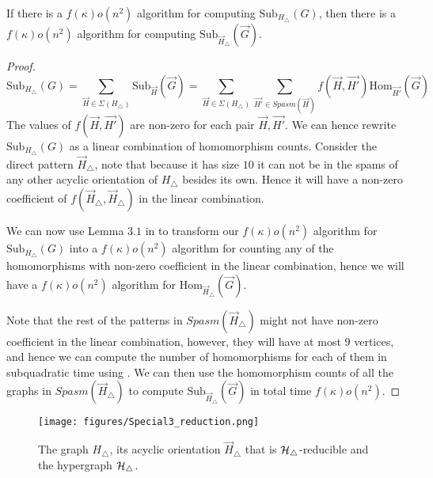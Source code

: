 \documentclass[a4paper,UKenglish,cleveref, autoref, numberwithinsect, thm-restate]{lipics-v2021}
\newcommand{\reducible}[1]{${#1}$-reducible}
\newcommand{\hyperthree}{\cH_\triangle}
\newcommand{\Hom}[2]{\mathrm{Hom}_{#2}(#1)}
\newcommand{\Sub}[2]{\mathrm{Sub}_{#2}(#1)}
\newcommand{\Spasm}{Spasm}
\newcommand{\degen}{\kappa}
\newcommand{\cH}{{\cal H}}
\begin{document}
	\begin{lemma} \label{lem:aux_conj}
		If there is a $f(\degen)o(n^2)$ algorithm for computing $\Sub{G}{H_\triangle}$, then there is a $f(\degen)o(n^2)$ algorithm for computing $\Sub{\vec{G}}{\vec{H}_\triangle}$.
	\end{lemma}
	\begin{proof}
		\begin{equation}
			\Sub{G}{H_\triangle} = \sum_{\vec{H} \in \Sigma(H_\triangle)} \Sub{\vec{G}}{\vec{H}} = \sum_{\vec{H} \in \Sigma(H_\triangle)} \sum_{\vec{H'} \in \Spasm(\vec{H})}  f(\vec{H},\vec{H'})\Hom{\vec{G}}{\vec{H'}}
		\end{equation}
	The values of $f(\vec{H},\vec{H'})$ are non-zero for each pair $\vec{H},\vec{H'}$. We can hence rewrite $\Sub{G}{H_\triangle}$ as a linear combination of homomorphism counts. Consider the direct pattern $\vec{H}_\triangle$, note that because it has size $10$ it can not be in the spams of any other acyclic orientation of $H_\triangle$ besides its own. Hence it will have a non-zero coefficient of $f(\vec{H}_\triangle,\vec{H}_\triangle)$ in the linear combination.
	
	We can now use Lemma $3.1$ in \cite{GiLeSh+23} to transform our $f(\degen)o(n^2)$ algorithm for $\Sub{G}{H_\triangle}$ into a $f(\degen)o(n^2)$ algorithm for counting any of the homomorphisms with non-zero coefficient in the linear combination, hence we will have a $f(\degen)o(n^2)$ algorithm for $\Hom{\vec{G}}{\vec{H}_\triangle}$.
	
	Note that the rest of the patterns in $\Spasm(\vec{H}_\triangle)$ might not have non-zero coefficient in the linear combination, however, they will have at most $9$ vertices, and hence we can compute the number of homomorphisms for each of them in subquadratic time using . We can then use the homomorphism counts of all the graphs in $\Spasm(\vec{H}_\triangle)$ to compute $\Sub{\vec{G}}{\vec{H}_\triangle}$ in total time $f(\degen)o(n^2)$.
	\end{proof}
	\begin{figure}
	\centering
	\texttt{[image: figures/Special3\_reduction.png]}\caption{The graph $H_\triangle$, its acyclic orientation $\vec{H}_\triangle$ that is \reducible{\hyperthree} and the hypergraph $\hyperthree$.}
	\label{fig:reduction_three}
	\end{figure}
		
\end{document}

